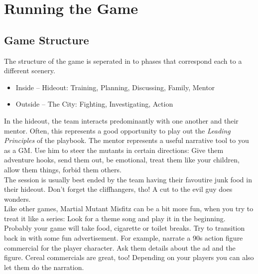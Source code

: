 \documentclass{book}
\begin{document}
\chapter*{Running the Game}
\section*{Game Structure}
The structure of the game is seperated in to phases that correspond each to a different scenery.
\begin{itemize}
    \item Inside -- Hideout: Training, Planning, Discussing, Family, Mentor
    \item Outside -- The City: Fighting, Investigating, Action
\end{itemize}
In the hideout, the team interacts predominantly with one another and their mentor. Often, this represents a good opportunity to play out the \emph{Leading Principles} of the playbook. The mentor represents a useful narrative tool to you as a GM. Use him to steer the mutants in certain directions: Give them adventure hooks, send them out, be emotional, treat them like your children, allow them things, forbid them others.\\
\medskip
The session is usually best ended by the team having their favoutire junk food in their hideout. Don't forget the cliffhangers, tho! A cut to the evil guy does wonders.\\
\medskip
Like other games, Martial Mutant Misfitz can be a bit more fun, when you try to treat it like a series: Look for a theme song and play it in the beginning. Probably your game will take food, cigarette or toilet breaks. Try to transition back in with some fun advertisement. For example, narrate a 90s action figure commercial for the player character. Ask them details about the ad and the figure. Cereal commercials are great, too! Depending on your players you can also let them do the narration.
\end{document}
